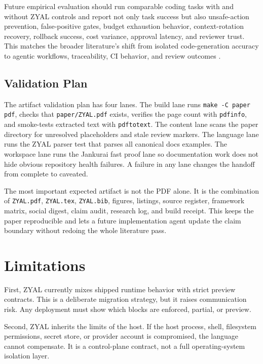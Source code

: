 \documentclass[conference]{IEEEtran}
\newcommand{\ZYAL}{ZYAL}
\begin{document}
Future empirical evaluation should run comparable coding tasks with and without \ZYAL{} controls and report not only task success but also unsafe-action prevention, false-positive gates, budget exhaustion behavior, context-rotation recovery, rollback success, cost variance, approval latency, and reviewer trust. This matches the broader literature's shift from isolated code-generation accuracy to agentic workflows, traceability, CI behavior, and review outcomes \cite{agenticProgrammingSurvey2025,failedAgenticPRs2026}.

\subsection{Validation Plan}

The artifact validation plan has four lanes. The build lane runs \texttt{make -C paper pdf}, checks that \texttt{paper/ZYAL.pdf} exists, verifies the page count with \texttt{pdfinfo}, and smoke-tests extracted text with \texttt{pdftotext}. The content lane scans the paper directory for unresolved placeholders and stale review markers. The language lane runs the ZYAL parser test that parses all canonical docs examples. The workspace lane runs the Jankurai fast proof lane so documentation work does not hide obvious repository health failures. A failure in any lane changes the handoff from complete to caveated.

The most important expected artifact is not the PDF alone. It is the combination of \texttt{ZYAL.pdf}, \texttt{ZYAL.tex}, \texttt{ZYAL.bib}, figures, listings, source register, framework matrix, social digest, claim audit, research log, and build receipt. This keeps the paper reproducible and lets a future implementation agent update the claim boundary without redoing the whole literature pass.

\section{Limitations}

First, \ZYAL{} currently mixes shipped runtime behavior with strict preview contracts. This is a deliberate migration strategy, but it raises communication risk. Any deployment must show which blocks are enforced, partial, or preview.

Second, \ZYAL{} inherits the limits of the host. If the host process, shell, filesystem permissions, secret store, or provider account is compromised, the language cannot compensate. It is a control-plane contract, not a full operating-system isolation layer.
\end{document}
